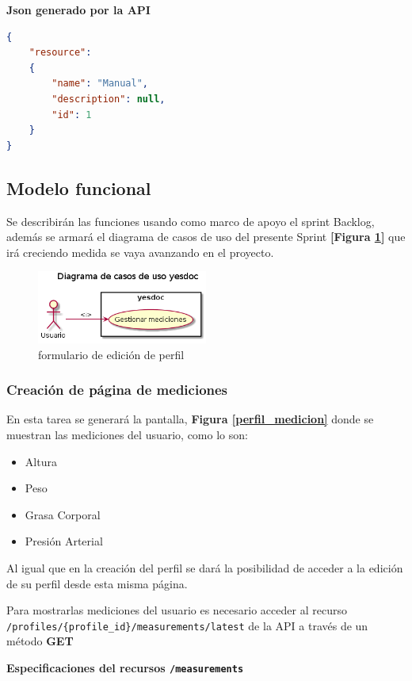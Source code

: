 \documentclass[a4paper,12pt]{article}
\begin{document}
    \textbf{Json generado por la API} 
    \begin{lstlisting}[language=json,firstnumber=1]
{
    "resource": 
    {
        "name": "Manual",
        "description": null,
        "id": 1
    }
}
    \end{lstlisting}
    
\subsection{Modelo funcional} %
Se describirán las funciones usando como marco de apoyo el sprint Backlog, además se armará el diagrama de casos de uso del presente Sprint \textbf{[Figura \ref{2-caso_de_uso}]} que irá creciendo  medida se vaya avanzando en el proyecto.
    \begin{figure}[h]
        \centering
        \includegraphics[width=0.5\textwidth]{img/2-caso_de_uso}
        \caption{formulario de edición de perfil}
		\label{2-caso_de_uso}
    \end{figure}

    
\subsubsection{Creación de página de mediciones}
En esta tarea  se generará la pantalla, \textbf{Figura \ref{perfil_medicion}} donde se muestran las mediciones del usuario, como lo son:
      \begin{itemize}
	      \item Altura
          \item Peso
          \item Grasa Corporal
          \item Presión Arterial
      \end{itemize}
      Al igual que en la creación del perfil se dará la posibilidad de acceder a la edición de su perfil desde esta misma página.
      
Para mostrarlas mediciones del usuario es necesario acceder al recurso \texttt{/profiles/\{profile\_id\}/measurements/latest} de la API a través de un método \textbf{GET}


      \textbf{Especificaciones del recursos \texttt{/measurements}}
\end{document}
